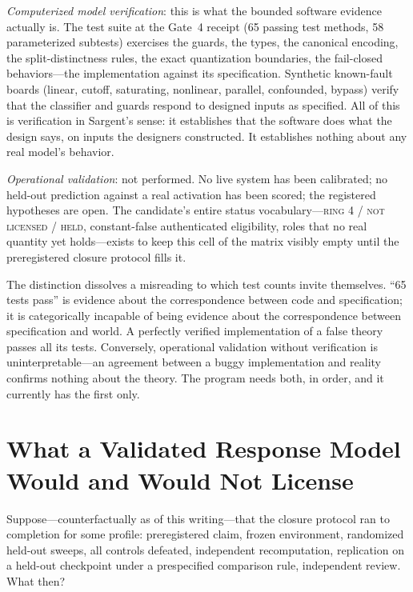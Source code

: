 \emph{Computerized model verification}: this is what the bounded software
evidence actually is. The test suite at the Gate~4 receipt (65 passing test
methods, 58 parameterized subtests) exercises the guards, the types, the
canonical encoding, the split-distinctness rules, the exact quantization
boundaries, the fail-closed behaviors---the implementation against its
specification. Synthetic known-fault boards (linear, cutoff, saturating,
nonlinear, parallel, confounded, bypass) verify that the classifier and
guards respond to designed inputs as specified. All of this is
verification in Sargent's sense: it establishes that the software does what
the design says, on inputs the designers constructed. It establishes
nothing about any real model's behavior.

\emph{Operational validation}: not performed. No live system has been
calibrated; no held-out prediction against a real activation has been
scored; the registered hypotheses are open. The candidate's entire status
vocabulary---\textsc{ring 4 / not licensed / held}, constant-false
authenticated eligibility, roles that no real quantity yet holds---exists
to keep this cell of the matrix visibly empty until the preregistered
closure protocol fills it.

\begin{remark}\label{ch06:rem:vandv}
The distinction dissolves a misreading to which test counts invite
themselves. ``65 tests pass'' is evidence about the correspondence between
code and specification; it is categorically incapable of being evidence
about the correspondence between specification and world. A perfectly
verified implementation of a false theory passes all its tests. Conversely,
operational validation without verification is uninterpretable---an
agreement between a buggy implementation and reality confirms nothing about
the theory. The program needs both, in order, and it currently has the
first only.
\end{remark}

\section{What a Validated Response Model Would and Would Not
License}\label{ch06:license}

Suppose---counterfactually as of this writing---that the closure protocol
ran to completion for some profile: preregistered claim, frozen
environment, randomized held-out sweeps, all controls defeated, independent
recomputation, replication on a held-out checkpoint under a prespecified
comparison rule, independent review. What then?

